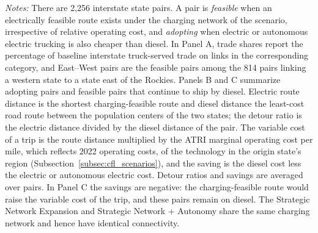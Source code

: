 \begin{table}[!htbp]
\vspace{0.5em}
\begin{minipage}{\textwidth}
\footnotesize
\textit{Notes:} There are 2,256 interstate state pairs. A pair is \emph{feasible} when an electrically feasible route exists under the charging network of the scenario, irrespective of relative operating cost, and \emph{adopting} when electric or autonomous electric trucking is also cheaper than diesel. In Panel A, trade shares report the percentage of baseline interstate truck-served trade on links in the corresponding category, and East--West pairs are the feasible pairs among the 814 pairs linking a western state to a state east of the Rockies. Panels B and C summarize adopting pairs and feasible pairs that continue to ship by diesel. Electric route distance is the shortest charging-feasible route and diesel distance the least-cost road route between the population centers of the two states; the detour ratio is the electric distance divided by the diesel distance of the pair. The variable cost of a trip is the route distance multiplied by the ATRI marginal operating cost per mile, which reflects 2022 operating costs, of the technology in the origin state's region (Subsection~\ref{subsec:cfl_scenarios}), and the saving is the diesel cost less the electric or autonomous electric cost. Detour ratios and savings are averaged over pairs. In Panel C the savings are negative: the charging-feasible route would raise the variable cost of the trip, and these pairs remain on diesel. The Strategic Network Expansion and Strategic Network + Autonomy share the same charging network and hence have identical connectivity.
\end{minipage}
\end{table}